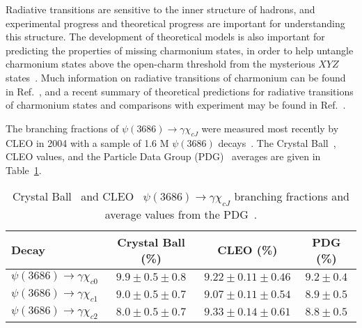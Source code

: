 \documentclass[aps,prd,twocolumn,showpacs,floatfix,byrevtex]{revtex4-1}
\newcommand\T{\rule{0pt}{2.6ex}}       %
\newcommand\B{\rule[-1.2ex]{0pt}{0pt}} %
\begin{document}
Radiative transitions are sensitive to the inner structure of
hadrons, and experimental progress and theoretical progress are important for
understanding this structure.  The development of theoretical models
is also important for predicting the properties of missing charmonium
states, in order to help untangle charmonium states above the open-charm
threshold from the mysterious $XYZ$ states~\cite{PDG16}.  Much information on
radiative transitions of charmonium can be found in Ref.~\cite{M1},
and a recent summary of theoretical predictions for radiative
transitions of charmonium states and comparisons with experiment may
be found in Ref.~\cite{Deng1}.

The branching fractions of $\psi(3686) \to \gamma \chi_{cJ}$ were
measured most recently by CLEO in 2004 with a sample of 1.6 M
$\psi(3686)$ decays~\cite{cleo04}.  The Crystal Ball~\cite{gaiser}, CLEO
values, and the Particle Data Group (PDG)~\cite{PDG16} averages are
given in Table~\ref{CLEO_results}.

\begin{table}[h]
\centering
\begin{footnotesize}
  \caption{Crystal Ball~\cite{gaiser} and CLEO~\cite{cleo04}
    $\psi(3686) \to \gamma \chi_{cJ}$ branching fractions and
    average values from the PDG~\cite{PDG16}.}
\vspace{0.05in}
\begin{tabular}{l|c|c|c} \hline \hline
\T Decay & Crystal Ball (\%) & CLEO (\%) & PDG (\%) \B \\ \hline
\T $\psi(3686) \to \gamma \chi_{c0}$ &  $9.9 \pm 0.5
\pm 0.8$ & $9.22 \pm 0.11 \pm 0.46$ &   $9.2 \pm 0.4$  \\  
$\psi(3686) \to \gamma \chi_{c1}$ & $9.0 \pm 0.5
\pm 0.7$ &  $9.07 \pm 0.11 \pm 0.54$ & $8.9 \pm 0.5$\\  
$\psi(3686) \to \gamma \chi_{c2}$ & $8.0 \pm 0.5
\pm 0.7$ & $9.33 \pm 0.14 \pm 0.61$ &  $8.8 \pm 0.5$ \B \\  
\hline \hline
\end{tabular}
\end{footnotesize}
\label{CLEO_results}
\end{table}
\end{document}
